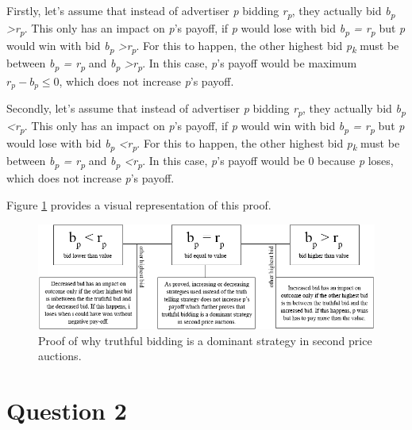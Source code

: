 \documentclass{article} %
\begin{document}
Firstly, let's assume that instead of advertiser \textit{p} bidding \textit{r\textsubscript{p}}, they actually bid \textit{b\textsubscript{p} \textgreater r\textsubscript{p}}. This only has an impact on \textit{p}'s payoff, if \textit{p} would lose with bid \textit{b\textsubscript{p} = r\textsubscript{p}} but \textit{p} would win with bid \textit{b\textsubscript{p} \textgreater r\textsubscript{p}}. For this to happen, the other highest bid \textit{p\textsubscript{k}} must be between \textit{b\textsubscript{p} = r\textsubscript{p}} and \textit{b\textsubscript{p} \textgreater r\textsubscript{p}}. In this case, \textit{p}'s payoff would be maximum $r_p - b_p \le 0$, which does not increase \textit{p}'s payoff.

Secondly, let's assume that instead of advertiser \textit{p} bidding \textit{r\textsubscript{p}}, they actually bid \textit{b\textsubscript{p} \textless r\textsubscript{p}}. This only has an impact on \textit{p}'s payoff, if \textit{p} would win with bid \textit{b\textsubscript{p} = r\textsubscript{p}} but \textit{p} would lose with bid \textit{b\textsubscript{p} \textless r\textsubscript{p}}. For this to happen, the other highest bid \textit{p\textsubscript{k}} must be between \textit{b\textsubscript{p} = r\textsubscript{p}} and \textit{b\textsubscript{p} \textless r\textsubscript{p}}. In this case, \textit{p}'s payoff would be 0 because \textit{p} loses, which does not increase \textit{p}'s payoff.

Figure \ref{fig:web_economics_1} provides a visual representation of this proof.

\begin{figure}[ht]
\centering
\includegraphics[width=1\textwidth]{web_economics_1}
\caption{Proof of why truthful bidding is a dominant strategy in second price auctions.}
\label{fig:web_economics_1}
\end{figure}

\section*{Question 2}
\end{document}
